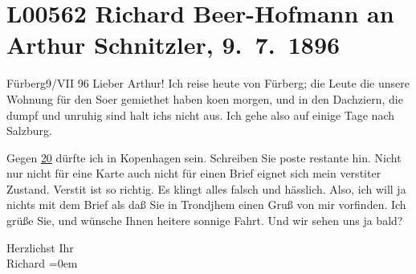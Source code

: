 

\section[Richard Beer-Hofmann an Arthur Schnitzler, 9. 7. 1896]{L00562 Richard Beer-Hofmann an Arthur Schnitzler, 9. 7. 1896}
\nopagebreak{}
\rehead{ }\normalsize\beginnumbering{}
\toendnotes[C]{\smallbreak\pagebreak[2]}
\toendnotes[C]{\smallbreak}
\pstart
           \raggedleft{}{\pb}Fürberg9/VII 96\pend
           \vspace{0.5em}
\pstart
           Lieber Arthur! Ich reise heute von Fürberg; die Leute die unsere Wohnung für den So{\geminationm}er gemiethet haben ko{\geminationm}en morgen, und in den Dachzi{\geminationm}ern, die dumpf und unruhig sind halt ichs nicht aus.
               Ich gehe also auf einige Tage nach Salzburg.\pend
           
\pstart
           Gegen \uline{20} dürfte ich in Kopenhagen sein.
               Schreiben Sie poste restante hin. Nicht {\pb}nur nicht für eine Karte auch nicht
               für einen Brief eignet sich mein versti{\geminationm}ter Zustand.
                  Versti{\geminationm}t ist so richtig. Es klingt alles falsch und
               hässlich. Also, ich will ja nichts mit dem Brief als daß Sie in Trondjhem einen Gruß von mir vorfinden. Ich grüße Sie, und
               wünsche Ihnen heitere sonnige {\pb}Fahrt. Und wir sehen uns ja bald?\pend
           
\pstart
           Herzlichst Ihr{\\[\baselineskip]}\spacefill\mbox{Richard}\pend
           \leftskip=0em{}\endnumbering{}  \newcommand{\dateiname}{L00562}\newcommand{\titel}{Richard Beer-Hofmann an Arthur Schnitzler, 9. 7. 1896}\newcommand{\editorInnen}{Martin Anton Müller und Gerd-Hermann Susen}
